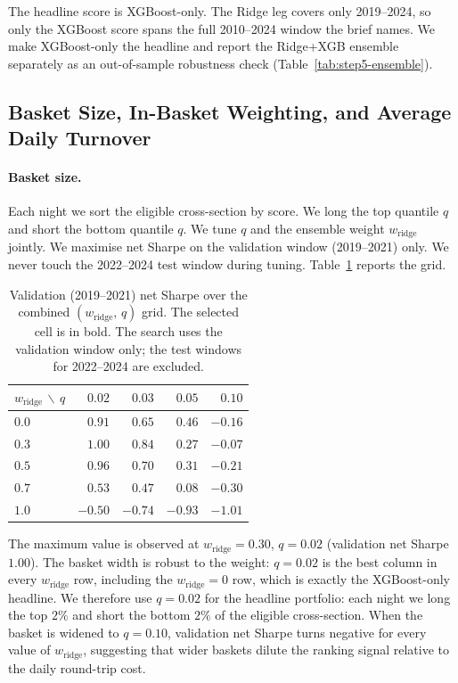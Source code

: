 \documentclass[12pt]{article}
\begin{document}
The headline score is XGBoost-only. The Ridge leg covers only 2019--2024, so only the XGBoost score spans the full 2010--2024 window the brief names. We make XGBoost-only the headline and report the Ridge+XGB ensemble separately as an out-of-sample robustness check (Table~\ref{tab:step5-ensemble}).

\subsection{Basket Size, In-Basket Weighting, and Average Daily Turnover}
\label{sec:step5q1}

\paragraph{Basket size.}
Each night we sort the eligible cross-section by score. We long the top quantile $q$ and short the bottom quantile $q$. We tune $q$ and the ensemble weight $w_{\text{ridge}}$ jointly. We maximise net Sharpe on the validation window (2019--2021) only. We never touch
the 2022--2024 test window during tuning. Table~\ref{tab:step5-valid-grid} reports the
grid.

\begin{table}[H]
  \centering
  \begin{tabular}{lrrrr}
    \toprule
    $w_{\text{ridge}}\,\backslash\,q$ & $0.02$ & $0.03$ & $0.05$ & $0.10$ \\
    \midrule
    $0.0$ & $0.91$          & $0.65$  & $0.46$  & $-0.16$ \\
    $0.3$ & $\mathbf{1.00}$ & $0.84$  & $0.27$  & $-0.07$ \\
    $0.5$ & $0.96$          & $0.70$  & $0.31$  & $-0.21$ \\
    $0.7$ & $0.53$          & $0.47$  & $0.08$  & $-0.30$ \\
    $1.0$ & $-0.50$         & $-0.74$ & $-0.93$ & $-1.01$ \\
    \bottomrule
  \end{tabular}
  \caption{Validation (2019--2021) net Sharpe over the combined $(w_{\text{ridge}},\,q)$ grid. The selected cell is in bold. The search uses the
  validation window only; the test windows for 2022–2024 are excluded.}
  \label{tab:step5-valid-grid}
\end{table}

The maximum value is observed at $w_{\text{ridge}}=0.30$, $q=0.02$ (validation net Sharpe $1.00$).
The basket width is robust to the weight: $q=0.02$ is the best column in every $w_{\text{ridge}}$ row, including the $w_{\text{ridge}}=0$ row, which is exactly the
XGBoost-only headline. We therefore use $q=0.02$ for the headline portfolio: each night we long the top $2\%$ and short the bottom $2\%$ of the eligible cross-section. When the basket is widened to $q=0.10$, validation net Sharpe turns negative for every value of $w_{\text{ridge}}$, suggesting that wider baskets dilute the ranking signal relative to the daily round-trip cost.
\end{document}

